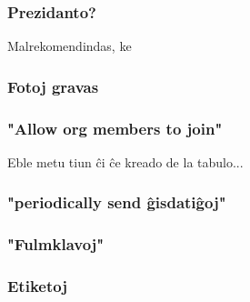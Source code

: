 \documentclass{beamer}
\begin{document}
  \begin{frame}
    \frametitle{Prezidanto?}
    
    Malrekomendindas, ke 
    
  \end{frame}
  

  \begin{frame}
    \frametitle{Fotoj gravas}

  \end{frame}


  \begin{frame}
    \frametitle{"Allow org members to join"}

    Eble metu tiun ĉi ĉe kreado de la tabulo...
  \end{frame}


  \begin{frame}
    \frametitle{"periodically send ĝisdatiĝoj"}

  \end{frame}


  \begin{frame}
    \frametitle{"Fulmklavoj"}

  \end{frame}


  \begin{frame}
    \frametitle{Etiketoj}

  \end{frame}
\end{document}
